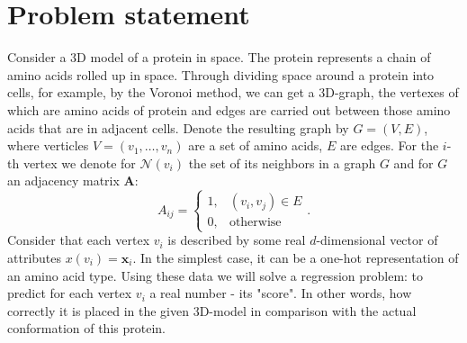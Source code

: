 \documentclass[12pt,twoside]{article}
\begin{document}
	\section{Problem statement}
	Consider a 3D model of a protein in space. The protein represents a chain of amino acids rolled up in space. 
	Through dividing space around a protein into cells, for example, by the Voronoi method, we can get a
	3D-graph, the vertexes of which are amino acids of protein and edges are carried out between those amino
	acids that are in adjacent cells. Denote the resulting graph by $G = (V, E)$, where verticles $V = (v_1, \ldots, v_n)$
	are a set of amino acids, $E$ are edges. For the $i$-th vertex we denote for $\mathcal{N}(v_i)$ the
	set of its neighbors in a graph $G$ and for $G$ an adjacency matrix $\boldsymbol{A}$:
	$$A_{ij} = \begin{cases}
		1, & (v_i, v_j) \in E \\
		0, & \text{otherwise}
	\end{cases}.$$ 
	Consider that each vertex $v_i$ is described by some real $d$-dimensional vector of attributes 
	$x(v_i) = \boldsymbol{x}_i$. In the simplest case, it can be a one-hot representation of an amino acid type.
	Using these data we will solve a regression problem: to predict for each vertex $v_i$ a real number - its
	"score". In other words, how correctly it is placed in the given 3D-model in comparison with the 
	actual conformation of this protein.
	
	
	
	
	
	
	
	
	
\end{document}
